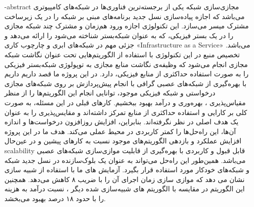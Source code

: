 \fa-abstract{
مجازی‌سازی شبکه یکی از برجسته‌ترین فناوری‌ها در شبکه‌های کامپیوتری می‌باشد که اجازه‌ پیاده‌سازی نسل جدید برنامه‌های مبنی بر شبکه را در یک زیرساخت مشترک میسر می‌سازد. این تکنولوژی اجازه ورود هم‌زمان و مشترک چند شبکه‌ مجازی را در یک بستر فیزیکی، که به عنوان شبکه‌بستر شناخته می‌شود را ارائه می‌دهد و جزئی مهم در شبکه‌های ابری و چارچوب کاری «\gls{Infrastructure as a Service}»
می‌باشد. تخصیص منبع در این تکنولوژی با استفاده‌ از  الگوریتم‌هایی تحت عنوان نگاشت شبکه مجازی 
 انجام می‌شود که وظیفه‌ی نگاشت منابع مجازی به توپولوژی شبکه‌بستر فیزیکی را به صورت استفاده حداکثری از منابع فیزیکی، دارد. در این پروژه ما قصد داریم داریم با بهره‌گیری از شبکه‌های عصبی گرافی با انجام پیش‌پردازش بر روی شبکه‌های مجازی درخواستی و شبکه فیزیکی موجود، توانایی انجام این الگوریتم‌ها را از منظر مقیاس‌پذیری ، بهره‌وری و درآمد بهبود ببخشیم. 
 کار‌های قبلی در این مسئله، به صورت کلی بر کارایی و  استفاده حداکثری از منابع تمرکز داشته‌‌اند و مقایس‌پذیری را به عنوان یک هدف اصلی در نظر نگرفته‌اند. بنابراین، افزایش روزافزون درخواست‌ها و اندازه‌ آن‌ها، این راه‌حل‌ها را کمتر کاربردی در محیط عملی می‌کند. هدف ما در این پروژه افزایش عملکرد و بازدهی الگوریتم‌های موجود نسبت به کار‌های پیشین و در عین‌حال \gls{scalability} قابل قبول و کاربردی با بهره‌گیری از قابلیت موازی‌سازی شبکه‌های عصبی می‌باشد. همین‌طور این راه‌حل می‌تواند به عنوان یک بلوک‌سازنده در نسل جدید شبکه‌ و شبکه‌های خودکار مورد استفاده قرار بگیرد. 
 آزمایش های ما با استفاده از شبیه سازی نشان می دهد که موازی سازی  زمان اجرای آن را با ضریب  ۸ کاهش می‌دهد. همچنین این الگوریتم در مقایسه با الگوریتم های شبیه‌سازی شده دیگر ، نسبت درآمد به هزینه را با حدود ۱۸ درصد بهبود می‌بخشد.
}
